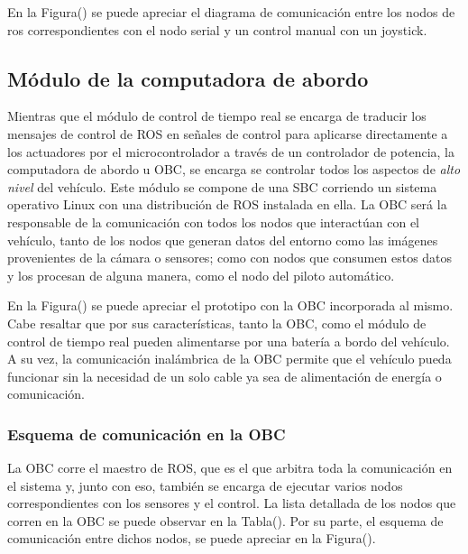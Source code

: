         En la Figura() se puede apreciar el diagrama de comunicación entre los nodos de ros correspondientes con el nodo serial 
        y un control manual con un joystick.

    
    \subsection{Módulo de la computadora de abordo}
    Mientras que el módulo de control de tiempo real se encarga de traducir los mensajes de control de ROS en señales de control 
    para aplicarse directamente a los actuadores por el microcontrolador a través de un controlador de potencia, la computadora 
    de abordo u OBC, se encarga se controlar todos los aspectos de \textit{alto nivel} del vehículo. Este módulo se compone de 
    una SBC corriendo un sistema operativo Linux con una distribución de ROS instalada en ella. La OBC será la responsable de 
    la comunicación con todos los nodos que interactúan con el vehículo, tanto  de los nodos que generan datos del entorno como 
    las imágenes provenientes de la cámara o sensores; como con nodos que consumen estos datos y los procesan de alguna manera, 
    como el nodo del piloto automático. 

    En la Figura() se puede apreciar el prototipo con la OBC incorporada al mismo. Cabe resaltar que por sus características, tanto 
    la OBC, como el módulo de control de tiempo real pueden alimentarse por una batería a bordo del vehículo. A su vez, la comunicación 
    inalámbrica de la OBC permite que el vehículo pueda funcionar sin la necesidad de un solo cable ya sea de alimentación de energía 
    o comunicación.


    \subsubsection{Esquema de comunicación en la OBC}
    La OBC corre el maestro de ROS, que es el que arbitra toda la comunicación en el sistema y, junto con eso, también se encarga 
    de ejecutar varios nodos correspondientes con los sensores y el control. La lista detallada de los nodos que corren en 
    la OBC se puede observar en la Tabla(). Por su parte, el esquema de comunicación entre dichos nodos, se puede apreciar en 
    la Figura().



